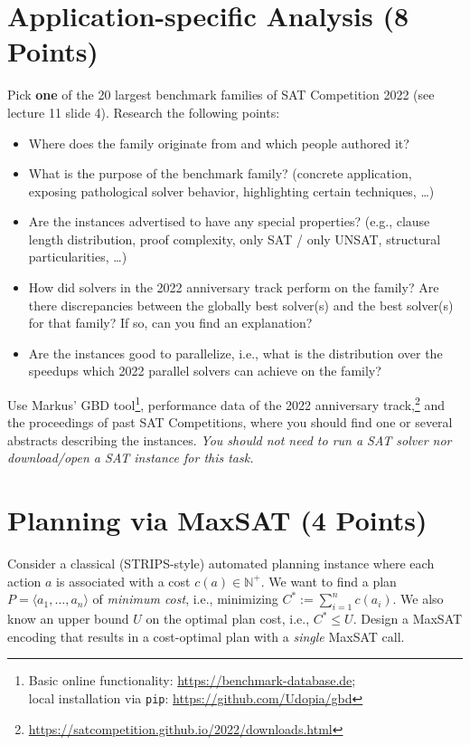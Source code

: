 \documentclass{article}
\begin{document}
\vspace*{-1em}

\section{Application-specific Analysis (8 Points)}

Pick \textbf{one} of the 20 largest benchmark families of SAT Competition 2022 (see lecture 11 slide 4).
Research the following points:
\begin{itemize}
	\item Where does the family originate from and which people authored it?
	\item What is the purpose of the benchmark family? (concrete application, exposing pathological solver behavior, highlighting certain techniques, \ldots)
	\item Are the instances advertised to have any special properties? (e.g., clause length distribution, proof complexity, only SAT / only UNSAT, structural particularities, \ldots)
	\item How did solvers in the 2022 anniversary track perform on the family? Are there discrepancies between the globally best solver(s) and the best solver(s) for that family? If so, can you find an explanation?
	\item Are the instances good to parallelize, i.e., what is the distribution over the speedups which 2022 parallel solvers can achieve on the family?
\end{itemize}
Use Markus' GBD tool\footnote{
	Basic online functionality: \url{https://benchmark-database.de};\\
	local installation via \texttt{pip}: \url{https://github.com/Udopia/gbd}
}, performance data of the 2022 anniversary track,\footnote{
	\url{https://satcompetition.github.io/2022/downloads.html}
} and the proceedings of past SAT Competitions, where you should find one or several abstracts describing the instances.
\textit{You should not need to run a SAT solver nor download/open a SAT instance for this task.}

\section{Planning via MaxSAT (4 Points)}

Consider a classical (STRIPS-style) automated planning instance where each action $a$ is associated with a cost $c(a) \in \mathbb{N}^+$.
We want to find a plan $P = \langle a_1, \ldots, a_n \rangle$ of \textit{minimum cost}, i.e., minimizing $C^* := \sum_{i=1}^n c({a_i})$.
We also know an upper bound $U$ on the optimal plan cost, i.e., $C^* \leq U$.
Design a MaxSAT encoding that results in a cost-optimal plan with a \textit{single} MaxSAT call.
\end{document}
